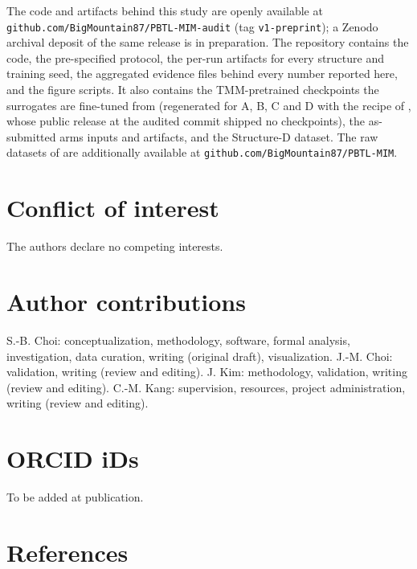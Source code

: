\documentclass[11pt,a4paper]{article}
\begin{document}
The code and artifacts behind this study are openly available at
\texttt{github.\allowbreak{}com/\allowbreak{}BigMountain87/\allowbreak{}PBTL-\allowbreak{}MIM-\allowbreak{}audit} (tag \texttt{v1-preprint}); a Zenodo archival deposit of
the same release is in preparation. The repository contains the code, the pre-specified protocol,
the per-run artifacts for every structure and training seed, the aggregated evidence
files behind every number reported here, and the figure scripts. It also contains the
TMM-pretrained checkpoints the surrogates are fine-tuned from (regenerated for A, B, C
and D with the recipe of \cite{choi20261}, whose public release at the audited commit shipped no checkpoints), the as-submitted
arm\textquotesingle s inputs and artifacts, and the Structure-D dataset. The raw datasets of \cite{choi20261} are
additionally available at \texttt{github.\allowbreak{}com/\allowbreak{}BigMountain87/\allowbreak{}PBTL-\allowbreak{}MIM}.

\section*{Conflict of interest}

The authors declare no competing interests.

\section*{Author contributions}

S.-B. Choi: conceptualization, methodology, software, formal analysis, investigation, data
curation, writing (original draft), visualization. J.-M. Choi: validation, writing (review
and editing). J. Kim: methodology, validation, writing (review and editing). C.-M. Kang: supervision, resources, project administration, writing (review and
editing).

\section*{ORCID iDs}

To be added at publication.

\section*{References}
\end{document}
